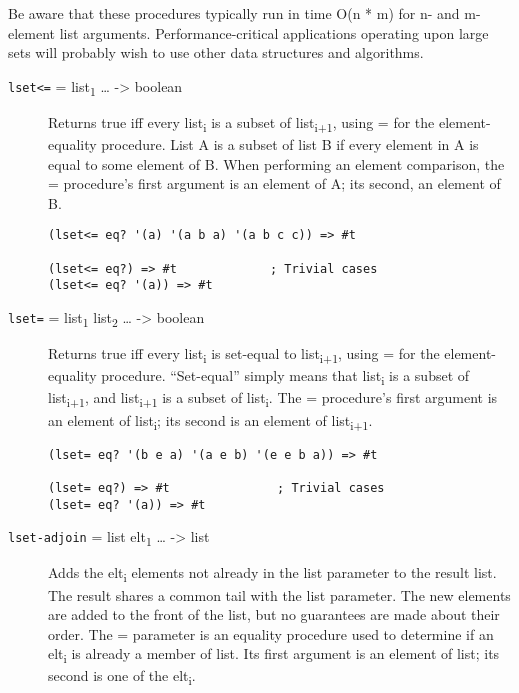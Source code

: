 Be aware that these procedures typically run in time O(n * m) for n- and
m-element list arguments. Performance-critical applications operating
upon large sets will probably wish to use other data structures and
algorithms.

\begin{description}
\item[ \href{}{} \texttt{lset\textless{}=} = list\textsubscript{1}
\ldots{} -\textgreater{} boolean ]
Returns true iff every list\textsubscript{i} is a subset of
list\textsubscript{i+1}, using = for the element-equality procedure.
List A is a subset of list B if every element in A is equal to some
element of B. When performing an element comparison, the = procedure's
first argument is an element of A; its second, an element of B.

\begin{verbatim}
(lset<= eq? '(a) '(a b a) '(a b c c)) => #t

(lset<= eq?) => #t             ; Trivial cases
(lset<= eq? '(a)) => #t
\end{verbatim}
\item[ \href{}{} \texttt{lset=} = list\textsubscript{1}
list\textsubscript{2} \ldots{} -\textgreater{} boolean ]
Returns true iff every list\textsubscript{i} is set-equal to
list\textsubscript{i+1}, using = for the element-equality procedure.
``Set-equal'' simply means that list\textsubscript{i} is a subset of
list\textsubscript{i+1}, and list\textsubscript{i+1} is a subset of
list\textsubscript{i}. The = procedure's first argument is an element of
list\textsubscript{i}; its second is an element of
list\textsubscript{i+1}.

\begin{verbatim}
(lset= eq? '(b e a) '(a e b) '(e e b a)) => #t

(lset= eq?) => #t               ; Trivial cases
(lset= eq? '(a)) => #t
\end{verbatim}
\item[ \href{}{} \texttt{lset-adjoin} = list elt\textsubscript{1}
\ldots{} -\textgreater{} list ]
Adds the elt\textsubscript{i} elements not already in the list parameter
to the result list. The result shares a common tail with the list
parameter. The new elements are added to the front of the list, but no
guarantees are made about their order. The = parameter is an equality
procedure used to determine if an elt\textsubscript{i} is already a
member of list. Its first argument is an element of list; its second is
one of the elt\textsubscript{i}.


\end{description}
